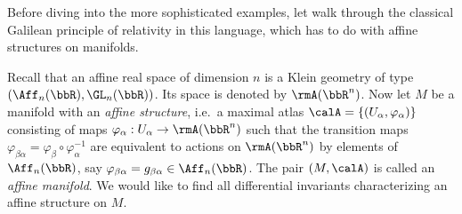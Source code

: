 Before diving into the more sophisticated examples, let walk through the classical Galilean principle of relativity in this language, which has to do with affine structures on manifolds.

\begin{example}
    Recall that an affine real space of dimension $n$ is a Klein geometry of type $(\Aff_n(\bbR),\GL_n(\bbR))$. Its space is denoted by $\rmA(\bbR^n)$. Now let $M$ be a manifold with an \emph{affine structure}, i.e.\ a maximal atlas $\calA=\{(U_\alpha,\varphi_\alpha)\}$ consisting of maps $\varphi_\alpha:U_\alpha\to \rmA(\bbR^n)$ such that the transition maps $\varphi_{\beta\alpha}=\varphi_\beta\circ\varphi_\alpha^{-1}$ are equivalent to actions on $\rmA(\bbR^n)$ by elements of $\Aff_n(\bbR)$, say $\varphi_{\beta\alpha}=g_{\beta\alpha}\in\Aff_n(\bbR)$. The pair $(M,\calA)$ is called an \emph{affine manifold}. We would like to find all differential invariants characterizing an affine structure on $M$.


\end{example}
